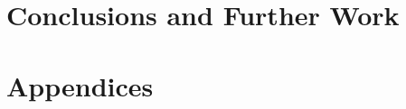 \documentclass[12pt]{article}
\begin{document}
\section{Conclusions and Further Work}

\newpage
\printbibliography

\appendix
\section{Appendices}
\end{document}
